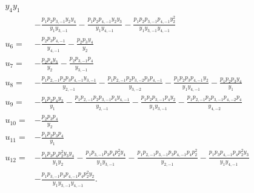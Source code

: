 \documentclass[11pt, oneside, reqno]{amsart}
\theoremstyle{definition} \newtheorem{definition}{Definition}[section]
\theoremstyle{definition} \newtheorem{remark}[definition]{Remark}
\theoremstyle{definition} \newtheorem{remarks}[definition]{Remarks}
\theoremstyle{definition} \newtheorem{question}[definition]{Question}
\theoremstyle{definition} \newtheorem*{note}{Note}
\theoremstyle{definition} \newtheorem{example}[definition]{Example}
\theoremstyle{definition} \newtheorem{examples}[definition]{Examples}
\begin{document}
\begin{align*}
{   y_{4}}{y_{1}}\\&-\frac{p_{1} p_{2} p_{3,-1} y_{2} y_{4}}{y_{1} y_{3,-1}}-\frac{p_{1} p_{2} p_{4,-1} y_{2} y_{3}}{y_{1} y_{4,-1}}-\frac{p_{1} p_{2} p_{3,-1} p_{4,-1} y_{2}^2}{y_{1} y_{3,-1} y_{4,-1}}
   \\
 u_{6}= &-\frac{p_{2} p_{3} p_{4,-1}}{y_{4,-1}}-\frac{p_{2} p_{3} y_{4}}{y_{2}} \\
 u_{7}= &-\frac{p_{2} p_{4} y_{3}}{y_{2}}-\frac{p_{2} p_{3,-1} p_{4}}{y_{3,-1}} \\
  u_{8}= &-\frac{p_{1} p_{2,-1} p_{2} p_{3} p_{4,-1} y_{3,-1}}{y_{2,-1}}-\frac{p_{1} p_{2,-1} p_{2} p_{3,-2} p_{3} p_{4,-1}}{y_{3,-2}}-\frac{p_{1} p_{2} p_{3} p_{4,-1} y_{2}}{y_{1} y_{4,-1}}-\frac{p_{1}
   p_{2} p_{3} y_{4}}{y_{1}} \\
 u_{9}= &-\frac{p_{1} p_{2} p_{4} y_{3}}{y_{1}}-\frac{p_{1} p_{2,-1} p_{2} p_{3,-1} p_{4} y_{4,-1}}{y_{2,-1}}-\frac{p_{1} p_{2} p_{3,-1} p_{4} y_{2}}{y_{1} y_{3,-1}}-\frac{p_{1} p_{2,-1} p_{2}
   p_{3,-1} p_{4,-2} p_{4}}{y_{4,-2}} \\
  u_{10}= &-\frac{p_{2} p_{3} p_{4}}{y_{2}} \\
 u_{11}= &-\frac{p_{1} p_{2} p_{3} p_{4}}{y_{1}} \\
 u_{12}= &-\frac{p_{1} p_{3} p_{4} p_{2}^2 y_{3} y_{4}}{y_{1} y_{2}}-\frac{p_{1} p_{3,-1} p_{3} p_{4} p_{2}^2 y_{4}}{y_{1} y_{3,-1}}-\frac{p_{1} p_{2,-1} p_{3,-1} p_{3} p_{4,-1} p_{4}
   p_{2}^2}{y_{2,-1}}-\frac{p_{1} p_{3} p_{4,-1} p_{4} p_{2}^2 y_{3}}{y_{1} y_{4,-1}}\\&-\frac{p_{1} p_{3,-1} p_{3} p_{4,-1} p_{4} p_{2}^2 y_{2}}{y_{1} y_{3,-1} y_{4,-1}}.
\end{align*}
\end{document}
